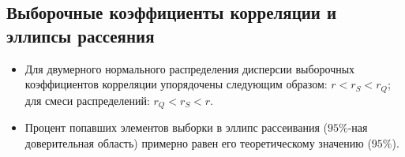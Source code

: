 \documentclass[../body.tex]{subfiles}
\begin{document}
	\subsection{Выборочные коэффициенты корреляции и эллипсы рассеяния}
	\begin{itemize}
		\item Для двумерного нормального распределения дисперсии выборочных коэффициентов корреляции упорядочены следующим образом: $r < r_{S} < r_{Q}$; для смеси распределений: $r_{Q} < r_{S} < r$.
		\item Процент попавших элементов выборки в эллипс рассеивания ($95\%$-ная доверительная область) примерно равен его теоретическому значению ($95\%$).
	\end{itemize}
\end{document}
